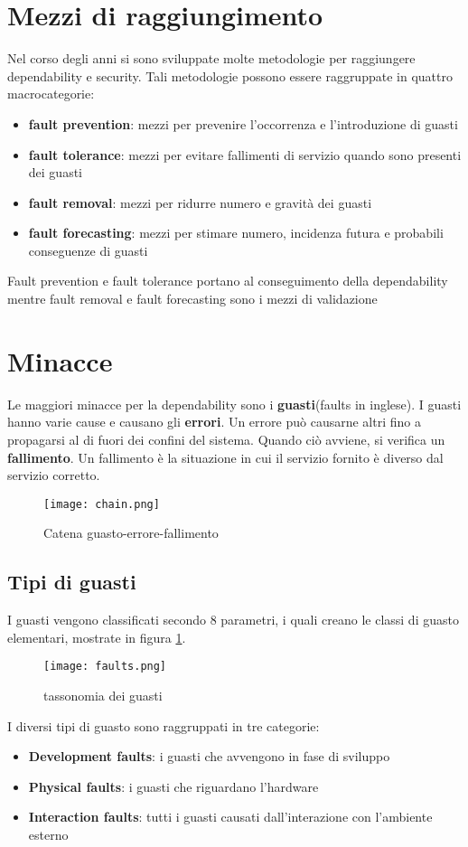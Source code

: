 \section{Mezzi di raggiungimento}
Nel corso degli anni si sono sviluppate molte metodologie per raggiungere dependability e security. Tali metodologie possono essere raggruppate in quattro macrocategorie:
\begin{itemize}
    \item \textbf{fault prevention}: mezzi per prevenire l'occorrenza e l'introduzione di guasti
    \item \textbf{fault tolerance}: mezzi per evitare fallimenti di servizio quando sono presenti dei guasti
    \item \textbf{fault removal}: mezzi per ridurre numero e gravità dei guasti
    \item \textbf{fault forecasting}: mezzi per stimare numero, incidenza futura e probabili conseguenze di guasti
\end{itemize}
Fault prevention e fault tolerance portano al conseguimento della dependability mentre fault removal e fault forecasting sono i mezzi di validazione
\section{Minacce}
Le maggiori minacce per la dependability sono i \textbf{guasti}(faults in inglese). I guasti hanno varie cause e causano gli \textbf{errori}. Un errore può causarne altri fino a propagarsi
al di fuori dei confini del sistema. Quando ciò avviene, si verifica un \textbf{fallimento}. Un fallimento è la situazione in cui il servizio fornito
è diverso dal servizio corretto.
\begin{figure}[h]
    \texttt{[image: chain.png]}
    \caption{Catena guasto-errore-fallimento}
\end{figure}
\subsection{Tipi di guasti}
I guasti vengono classificati secondo 8 parametri, i quali creano le classi di guasto elementari, mostrate in figura \ref{fig:tax}.
\begin{figure}[h]
    \texttt{[image: faults.png]}
    \caption{tassonomia dei guasti\cite{tax}}
    \label{fig:tax}
\end{figure}
 I diversi tipi di guasto sono raggruppati in tre categorie:
 \begin{itemize}
     \item \textbf{Development faults}: i guasti che avvengono in fase di sviluppo
     \item \textbf{Physical faults}: i guasti che riguardano l'hardware
     \item \textbf{Interaction faults}: tutti i guasti causati dall'interazione con l'ambiente esterno
 \end{itemize}
 \newpage
